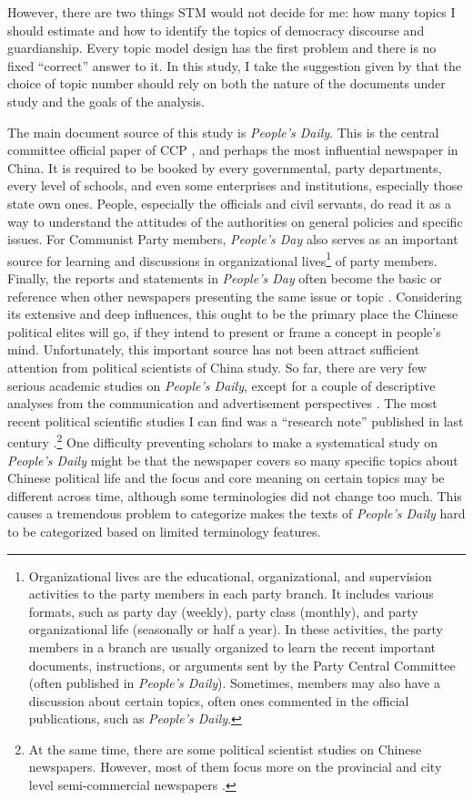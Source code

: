 \documentclass[abstracton,UTF8]{ctexart}
\begin{document}
However, there are two things STM would not decide for me: how many topics I should estimate and how to identify the topics of democracy discourse and guardianship. Every topic model design has the first problem and there is no fixed ``correct'' answer to it. In this study, I take the suggestion given by \citep{Roberts2014} that the choice of topic number should rely on both the nature of the documents under study and the goals of the analysis. 

The main document source of this study is \textit{People's Daily}. This is the central committee official paper of CCP \citep{People}, and perhaps the most influential newspaper in China. It is required to be booked by every governmental, party departments, every level of schools, and even some enterprises and institutions, especially those state own ones. People, especially the officials and civil servants, do read it as a way to understand the attitudes of the authorities on general policies and specific issues. For Communist Party members, \textit{People's Day} also serves as an important source for learning and discussions in organizational lives\footnote{Organizational lives are the educational, organizational, and supervision activities to the party members in each party branch. It includes various formats, such as party day (weekly), party class (monthly), and party organizational life (seasonally or half a year). In these activities, the party members in a branch are usually organized to learn the recent important documents, instructions, or arguments sent by the Party Central Committee (often published in \textit{People's Daily}). Sometimes, members may also have a discussion about certain topics, often ones commented in the official publications, such as \textit{People's Daily}.} of party members. Finally, the reports and statements in \textit{People's Day} often become the basic or reference when other newspapers presenting the same issue or topic \citep{Roberts2015}. Considering its extensive and deep influences, this ought to be the primary place the Chinese political elites will go, if they intend to present or frame a concept in people's mind. Unfortunately, this important source has not been attract sufficient attention from political scientists of China study. So far, there are very few serious academic studies on \textit{People's Daily}, except for a couple of descriptive analyses from the communication and advertisement perspectives \citep{Chute1995,Swanson1996}. The most recent political scientific studies I can find was a ``research note'' published in last century \citep{Wu1994}.\footnote{At the same time, there are some political scientist studies on Chinese newspapers. However, most of them focus more on the provincial and city level semi-commercial newspapers \citep[for example, see ][]{Shirk2010,Reich2014,Roberts2015}.} One difficulty preventing scholars to make a systematical study on \textit{People's Daily} might be that the newspaper covers so many specific topics about Chinese political life and the focus and core meaning on certain topics may be different across time, although some terminologies did not change too much. This causes a tremendous problem to categorize  makes the texts of \textit{People's Daily} hard to be categorized based on limited terminology features. 
\end{document}
